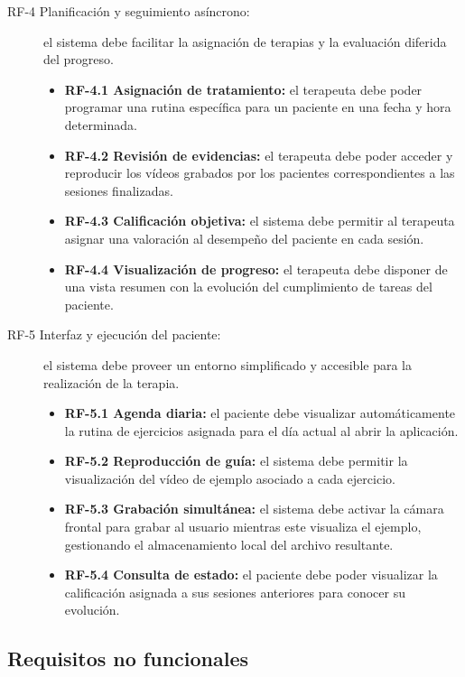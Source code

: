 \begin{description}
    \item[RF-4 Planificación y seguimiento asíncrono:] el sistema debe facilitar la asignación de terapias y la evaluación diferida del progreso.
    \begin{itemize}
        \item \textbf{RF-4.1 Asignación de tratamiento:} el terapeuta debe poder programar una rutina específica para un paciente en una fecha y hora determinada.
        \item \textbf{RF-4.2 Revisión de evidencias:} el terapeuta debe poder acceder y reproducir los vídeos grabados por los pacientes correspondientes a las sesiones finalizadas.
        \item \textbf{RF-4.3 Calificación objetiva:} el sistema debe permitir al terapeuta asignar una valoración al desempeño del paciente en cada sesión.
        \item \textbf{RF-4.4 Visualización de progreso:} el terapeuta debe disponer de una vista resumen con la evolución del cumplimiento de tareas del paciente.
    \end{itemize}

    \item[RF-5 Interfaz y ejecución del paciente:] el sistema debe proveer un entorno simplificado y accesible para la realización de la terapia.
    \begin{itemize}
        \item \textbf{RF-5.1 Agenda diaria:} el paciente debe visualizar automáticamente la rutina de ejercicios asignada para el día actual al abrir la aplicación.
        \item \textbf{RF-5.2 Reproducción de guía:} el sistema debe permitir la visualización del vídeo de ejemplo asociado a cada ejercicio.
        \item \textbf{RF-5.3 Grabación simultánea:} el sistema debe activar la cámara frontal para grabar al usuario mientras este visualiza el ejemplo, gestionando el almacenamiento local del archivo resultante.
        \item \textbf{RF-5.4 Consulta de estado:} el paciente debe poder visualizar la calificación asignada a sus sesiones anteriores para conocer su evolución.
    \end{itemize}
\end{description}

\subsection{Requisitos no funcionales}

